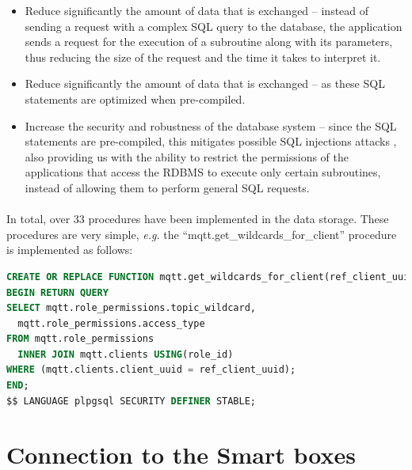 \begin{itemize}
    \item Reduce significantly the amount of data that is exchanged -- instead of sending a request with a complex \acs{SQL} query to the database, the application sends a request for the execution of a subroutine along with its parameters, thus reducing the size of the request and the time it takes to interpret it.
    \item Reduce significantly the amount of data that is exchanged -- as these \acs{SQL} statements are optimized when pre-compiled.
    \item Increase the security and robustness of the database system -- since the \acs{SQL} statements are pre-compiled, this mitigates possible \acs{SQL} injections attacks \cite{clarke2012sql}, also providing us with the ability to restrict the permissions of the applications that access the \acs{RDBMS} to execute only certain subroutines, instead of allowing them to perform general \acs{SQL} requests.
\end{itemize}

\paragraph{} In total, over 33 procedures have been implemented in the data storage. These procedures are very simple, \textit{e.g.} the ``mqtt.get\_wildcards\_for\_client'' procedure is implemented as follows:

\begin{lstlisting}[language=sql]     
CREATE OR REPLACE FUNCTION mqtt.get_wildcards_for_client(ref_client_uuid uuid) RETURNS TABLE (topic_wildcard text, access_type int) AS $$ 
BEGIN RETURN QUERY
SELECT mqtt.role_permissions.topic_wildcard,
  mqtt.role_permissions.access_type
FROM mqtt.role_permissions
  INNER JOIN mqtt.clients USING(role_id)
WHERE (mqtt.clients.client_uuid = ref_client_uuid);
END;
$$ LANGUAGE plpgsql SECURITY DEFINER STABLE;
\end{lstlisting}

\section{Connection to the Smart boxes}


